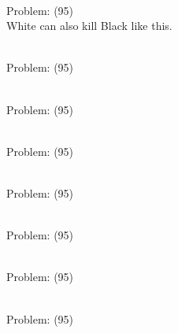 \documentclass[11pt]{article}
\begin{document}
\begin{minipage}[t]{0.5\textwidth}
  {\centering
  
\\
Problem: (95)\\
White can also kill Black like this.\\
  }
\end{minipage}
\begin{minipage}[t]{0.5\textwidth}
  {\centering
  
\\
Problem: (95)\\
  }
\end{minipage}
\begin{minipage}[t]{0.5\textwidth}
  {\centering
  
\\
Problem: (95)\\
  }
\end{minipage}
\begin{minipage}[t]{0.5\textwidth}
  {\centering
  
\\
Problem: (95)\\
  }
\end{minipage}
\begin{minipage}[t]{0.5\textwidth}
  {\centering
  
\\
Problem: (95)\\
  }
\end{minipage}
\begin{minipage}[t]{0.5\textwidth}
  {\centering
  
\\
Problem: (95)\\
  }
\end{minipage}
\begin{minipage}[t]{0.5\textwidth}
  {\centering
  
\\
Problem: (95)\\
  }
\end{minipage}
\begin{minipage}[t]{0.5\textwidth}
  {\centering
  
\\
Problem: (95)\\
  }
\end{minipage}
\end{document}
